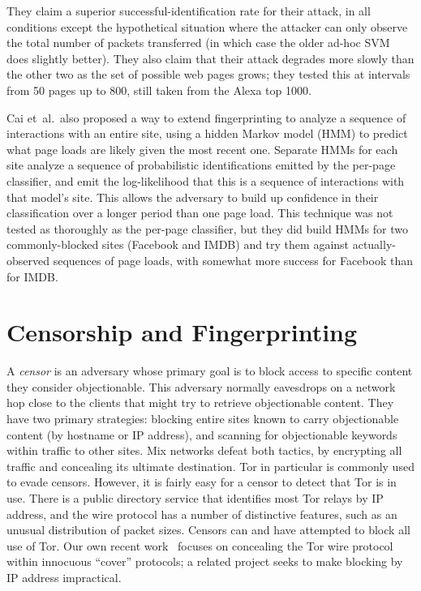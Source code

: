 \documentclass{cmuecequal}
\begin{document}
They claim a superior successful-identification rate for their attack,
in all conditions except the hypothetical situation where the attacker
can only observe the total number of packets transferred (in which
case the older ad-hoc SVM does slightly better).  They also claim that
their attack degrades more slowly than the other two as the set of
possible web pages grows; they tested this at intervals from 50 pages
up to 800, still taken from the Alexa top 1000.

Cai et~al.\ also proposed a way to extend fingerprinting to analyze a
sequence of interactions with an entire site, using a hidden Markov
model (HMM) to predict what page loads are likely given the most
recent one.  Separate HMMs for each site analyze a sequence of
probabilistic identifications emitted by the per-page classifier, and
emit the log-likelihood that this is a sequence of interactions with
that model's site.  This allows the adversary to build up confidence
in their classification over a longer period than one page load.  This
technique was not tested as thoroughly as the per-page classifier,
but they did build HMMs for two commonly-blocked sites (Facebook and
IMDB) and try them against actually-observed sequences of page loads,
with somewhat more success for Facebook than for IMDB.

\section{Censorship and Fingerprinting}

A \emph{censor} is an adversary whose primary goal is to block access
to specific content they consider objectionable.  This adversary
normally eavesdrops on a network hop close to the clients that might
try to retrieve objectionable content.  They have two primary
strategies: blocking entire sites known to carry objectionable content
(by hostname or IP address), and scanning for objectionable keywords
within traffic to other sites.  Mix networks defeat both tactics, by
encrypting all traffic and concealing its ultimate destination.  Tor
in particular is commonly used to evade censors.  However, it is
fairly easy for a censor to detect that Tor is in use.  There is a
public directory service that identifies most Tor relays by IP
address, and the wire protocol has a number of distinctive features,
such as an unusual distribution of packet sizes.  Censors can and have
attempted to block all use of Tor.  Our own recent
work~\cite{ccs2012-stegotorus} focuses on concealing the Tor wire
protocol within innocuous “cover” protocols; a related project seeks
to make blocking by IP address impractical.
\end{document}
